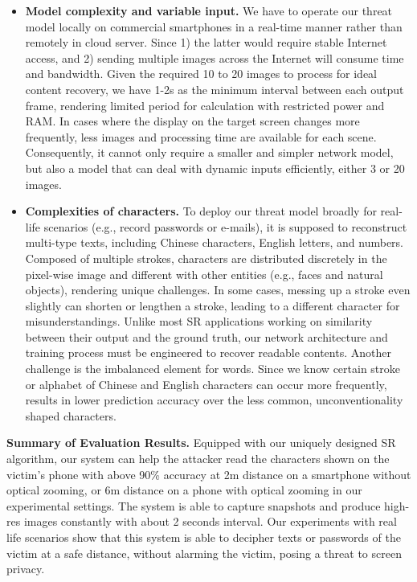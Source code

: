 \begin{itemize}[leftmargin=*]
  \item \textbf{Model complexity and variable input.} We have to operate our threat model locally on commercial smartphones in a real-time manner rather than remotely in cloud server. Since 1) the latter would require stable Internet access, and 2) sending multiple images across the Internet will consume time and bandwidth. Given the required 10 to 20 images to process for ideal content recovery, we have 1-2s as the minimum interval between each output frame, rendering limited period for calculation with restricted power and RAM. In cases where the display on the target screen changes more frequently, less images and processing time are available for each scene. Consequently, it cannot only require a smaller and simpler network model, but also a model that can deal with dynamic inputs efficiently, either 3 or 20 images.
  \item \textbf{Complexities of characters.} To deploy our threat model broadly for real-life scenarios (e.g., record passwords or e-mails), it is supposed to reconstruct multi-type texts, including Chinese characters, English letters, and numbers. Composed of multiple strokes, characters are distributed discretely in the pixel-wise image and different with other entities (e.g., faces and natural objects), rendering unique challenges. In some cases, messing up a stroke even slightly can shorten or lengthen a stroke, leading to a different character for misunderstandings. Unlike most SR applications working on similarity between their output and the ground truth, our network architecture and training process must be engineered to recover readable contents. Another challenge is the imbalanced element for words. Since we know certain stroke or alphabet of Chinese and English characters can occur more frequently, results in lower prediction accuracy over the less common, unconventionality shaped characters.
\end{itemize}

\vspace{1mm}
\noindent
\textbf{Summary of Evaluation Results.}
Equipped with our uniquely designed SR algorithm, our system can help the attacker read the characters shown on the victim's phone with above 90\% accuracy at 2m distance on a smartphone without optical zooming, or 6m distance on a phone with optical zooming in our experimental settings. The system is able to capture snapshots and produce high-res images constantly with about 2 seconds interval. Our experiments with real life scenarios show that this system is able to decipher texts or passwords of the victim at a safe distance, without alarming the victim, posing a threat to screen privacy.

